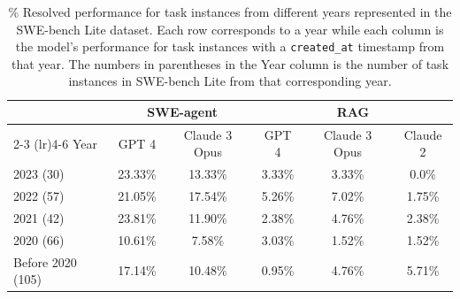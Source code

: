\begin{table}[ht]
\caption{
\% Resolved performance for task instances from different years represented in the SWE-bench Lite dataset.
Each row corresponds to a year while each column is the model's performance for task instances with a \texttt{created\_at} timestamp from that year.
The numbers in parentheses in the Year column is the number of task instances in SWE-bench Lite from that corresponding year.
}
\label{table.results_by_temporal}
\vspace{0.25em}
\centering
\begin{tabular}{lccccc}
    \toprule
         & \multicolumn{2}{c}{SWE-agent} & \multicolumn{3}{c}{RAG} \\
           \cmidrule(lr){2-3} \cmidrule(lr){4-6}
    Year & GPT 4 & Claude 3 Opus & GPT 4  & Claude 3 Opus & Claude 2\\
    \midrule
        2023 (30) & 23.33\% & 13.33\% & 3.33\% & 3.33\% & 0.0\% \\
        2022 (57) & 21.05\% & 17.54\% & 5.26\% & 7.02\% & 1.75\% \\
        2021 (42) & 23.81\% & 11.90\% & 2.38\% & 4.76\% & 2.38\% \\
        2020 (66) & 10.61\% & \phantom{0}7.58\% & 3.03\% & 1.52\% & 1.52\% \\
        Before 2020 (105) & 17.14\% & 10.48\% & 0.95\% & 4.76\% & 5.71\% \\
    \bottomrule
\end{tabular}
\end{table}